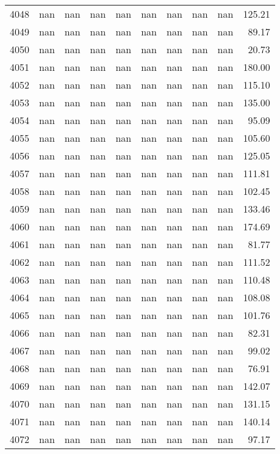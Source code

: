 \begin{tabular}{lrrrrrrrrr}
4048 & nan & nan & nan & nan & nan & nan & nan & nan & 125.21 \\
4049 & nan & nan & nan & nan & nan & nan & nan & nan & 89.17 \\
4050 & nan & nan & nan & nan & nan & nan & nan & nan & 20.73 \\
4051 & nan & nan & nan & nan & nan & nan & nan & nan & 180.00 \\
4052 & nan & nan & nan & nan & nan & nan & nan & nan & 115.10 \\
4053 & nan & nan & nan & nan & nan & nan & nan & nan & 135.00 \\
4054 & nan & nan & nan & nan & nan & nan & nan & nan & 95.09 \\
4055 & nan & nan & nan & nan & nan & nan & nan & nan & 105.60 \\
4056 & nan & nan & nan & nan & nan & nan & nan & nan & 125.05 \\
4057 & nan & nan & nan & nan & nan & nan & nan & nan & 111.81 \\
4058 & nan & nan & nan & nan & nan & nan & nan & nan & 102.45 \\
4059 & nan & nan & nan & nan & nan & nan & nan & nan & 133.46 \\
4060 & nan & nan & nan & nan & nan & nan & nan & nan & 174.69 \\
4061 & nan & nan & nan & nan & nan & nan & nan & nan & 81.77 \\
4062 & nan & nan & nan & nan & nan & nan & nan & nan & 111.52 \\
4063 & nan & nan & nan & nan & nan & nan & nan & nan & 110.48 \\
4064 & nan & nan & nan & nan & nan & nan & nan & nan & 108.08 \\
4065 & nan & nan & nan & nan & nan & nan & nan & nan & 101.76 \\
4066 & nan & nan & nan & nan & nan & nan & nan & nan & 82.31 \\
4067 & nan & nan & nan & nan & nan & nan & nan & nan & 99.02 \\
4068 & nan & nan & nan & nan & nan & nan & nan & nan & 76.91 \\
4069 & nan & nan & nan & nan & nan & nan & nan & nan & 142.07 \\
4070 & nan & nan & nan & nan & nan & nan & nan & nan & 131.15 \\
4071 & nan & nan & nan & nan & nan & nan & nan & nan & 140.14 \\
4072 & nan & nan & nan & nan & nan & nan & nan & nan & 97.17 \\

\end{tabular}
